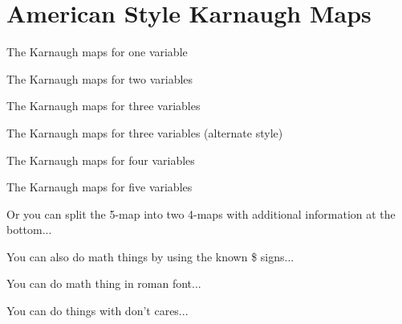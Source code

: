 \documentclass[a4paper,12pt,fleqn]{article}
\begin{document}
\newpage
\section*{American Style Karnaugh Maps}

The Karnaugh maps for one variable
\medskip

\bigskip

The Karnaugh maps for two variables
\medskip

\bigskip

The Karnaugh maps for three variables
\medskip

\bigskip

The Karnaugh maps for three variables (alternate style)
\medskip

\bigskip

The Karnaugh maps for four variables
\medskip

\bigskip

\newpage
The Karnaugh maps for five variables
\medskip

\bigskip

Or you can split the 5-map into two 4-maps with additional information
at the bottom...
\medskip

\bigskip




\newpage
You can also do math things by using the known \$ signs...
\medskip

\bigskip

You can do math thing in roman font...
\medskip

%
\bigskip

You can do things with don't cares...
\medskip

\bigskip
\end{document}
